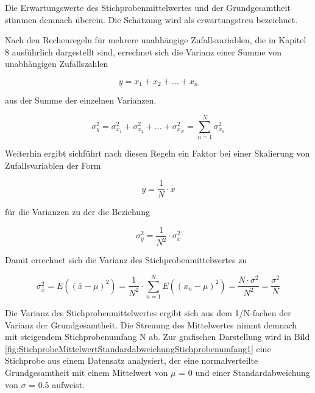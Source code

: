 \noindent Die Erwartungswerte des Stichprobenmittelwertes und der Grundgesamtheit stimmen demnach \"{u}berein. Die Sch\"{a}tzung wird als erwartungstreu bezeichnet.\newline

\noindent Nach den Rechenregeln f\"{u}r mehrere unabh\"{a}ngige Zufallsvariablen, die in Kapitel 8 ausf\"{u}hrlich dargestellt sind, errechnet sich die Varianz einer Summe von unabh\"{a}ngigen Zufallszahlen 

\begin{equation}\label{eq:fivesix}
y=x_{1} +x_{2} +...+x_{n}
\end{equation}

\noindent aus der Summe der einzelnen Varianzen. 

\begin{equation}\label{eq:fiveseven}
\sigma _{y}^{2} =\sigma _{x_{1} }^{2} +\sigma _{x_{2} }^{2} +...+\sigma _{x_{N} }^{2} =\sum _{n=1}^{N}\sigma _{x_{n} }^{2}
\end{equation}

\noindent Weiterhin ergibt sichf\"{u}hrt  nach diesen Regeln ein Faktor bei einer Skalierung von Zufallsvariablen der Form 

\begin{equation}\label{eq:fiveeight}
y=\dfrac{1}{N} \cdot x
\end{equation}

\noindent f\"{u}r die Varianzen zu der die Beziehung

\begin{equation}\label{eq:fivenine}
\sigma _{y}^{2} =\dfrac{1}{N^{2} } \cdot \sigma _{x}^{2}
\end{equation}

\noindent Damit errechnet sich die Varianz des Stichprobenmittelwertes zu

\begin{equation}\label{eq:fiveten}
\sigma _{\bar{x}}^{2} =E\left(\left(\bar{x}-\mu \right)^{2} \right)=\dfrac{1}{N^{2} } \cdot \sum _{n=1}^{N}E\left(\left(x_{n} -\mu \right)^{2} \right) =\dfrac{N\cdot \sigma ^{2} }{N^{2} } =\dfrac{\sigma ^{2} }{N}
\end{equation}

\noindent Die Varianz des Stichprobenmittelwertes ergibt sich aus dem 1/N-fachen der Varianz der Grundgesamtheit. Die Streuung des Mittelwertes nimmt demnach mit steigendem Stichprobenumfang N ab. Zur grafischen Darstellung wird in Bild \ref{fig:StichprobeMittelwertStandardabweichungStichprobenumfang1} eine Stichprobe aus einem Datensatz analysiert, der eine normalverteilte Grundgesamtheit mit einem Mittelwert von $\mu$ = 0 und einer Standardabweichung von $\sigma$ = 0.5 aufweist. 

